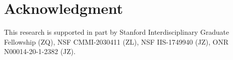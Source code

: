 \section*{Acknowledgment}
This research is supported in part by Stanford Interdisciplinary Graduate Fellowship (ZQ),  
NSF CMMI-2030411 (ZL), NSF IIS-1749940 (JZ), ONR N00014-20-1-2382 (JZ).